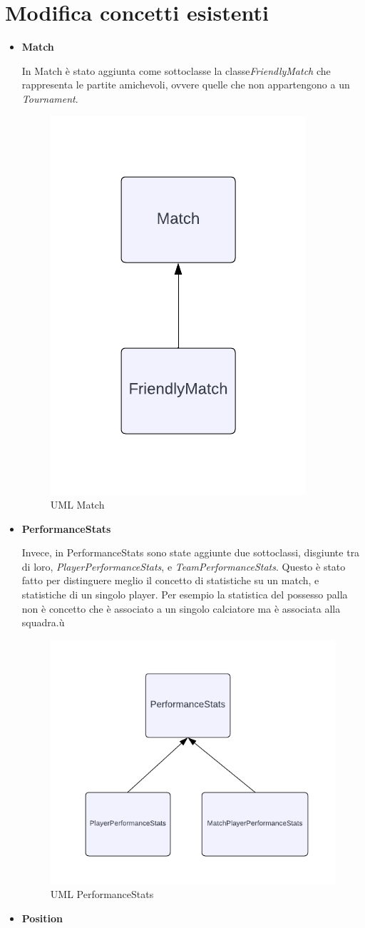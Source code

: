 \documentclass[11pt]{report} %
\begin{document}
 \section{Modifica concetti esistenti}

 \begin{itemize}
     \item \textbf{Match}

     In Match è stato aggiunta come sottoclasse la  classe\textit{FriendlyMatch} che rappresenta le partite amichevoli, ovvere quelle che non appartengono a un \textit{Tournament}.
    \begin{figure}[H]
        \centering
        \includegraphics[width=0.3\linewidth]{MATCH.png}
        \caption{UML Match}
        \label{fig:enter-label}
    \end{figure}
     \item \textbf{PerformanceStats}

     Invece, in PerformanceStats sono state aggiunte due sottoclassi, disgiunte tra di loro, \textit{PlayerPerformanceStats}, e \textit{TeamPerformanceStats}. Questo è stato fatto per distinguere meglio il concetto di statistiche su un match, e statistiche di un singolo player.
     Per esempio la statistica del possesso palla non è concetto che è associato a un singolo calciatore ma è associata alla squadra.ù
     \begin{figure}[H]
         \centering
         \includegraphics[width=0.4\linewidth]{STATS.png}
         \caption{UML PerformanceStats}
         \label{fig:enter-label}
     \end{figure}
     \item \textbf{Position}


\end{itemize}
\end{document}
